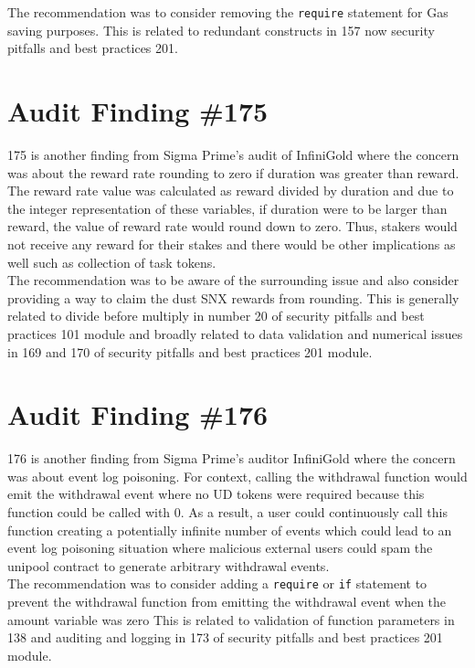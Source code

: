 The recommendation was to consider removing the \verb|require| statement for Gas saving purposes. This is related to redundant constructs in 157 now security pitfalls and best practices 201.

\section{Audit Finding \#175}

175 is another finding from Sigma Prime's audit of InfiniGold where the concern was about the reward rate rounding to zero if duration was greater than reward. The reward rate value was calculated as reward divided by duration and due to the integer representation of these variables, if duration were to be larger than reward, the value of reward rate would round down to zero. Thus, stakers would not receive any reward for their stakes and there would be other implications as well such as collection of task tokens.\\

The recommendation was to be aware of the surrounding issue and also consider providing a way to claim the dust SNX rewards from rounding. This is generally related to divide before multiply in number 20 of security pitfalls and best practices 101 module and broadly related to data validation and numerical issues in 169 and 170 of security pitfalls and best practices 201 module.

\section{Audit Finding \#176}

176 is another finding from Sigma Prime's auditor InfiniGold where the concern was about event log poisoning. For context, calling the withdrawal function would emit the withdrawal event where no UD tokens were required because this function could be called with 0. As a result, a user could continuously call this function creating a potentially infinite number of events which could lead to an event log poisoning situation where malicious external users could spam the unipool contract to generate arbitrary withdrawal events.\\

The recommendation was to consider adding a \verb|require| or \verb|if| statement to prevent the withdrawal function from emitting the withdrawal event when the amount variable was zero This is related to validation of function parameters in 138 and auditing and logging in 173 of security pitfalls and best practices 201 module.

